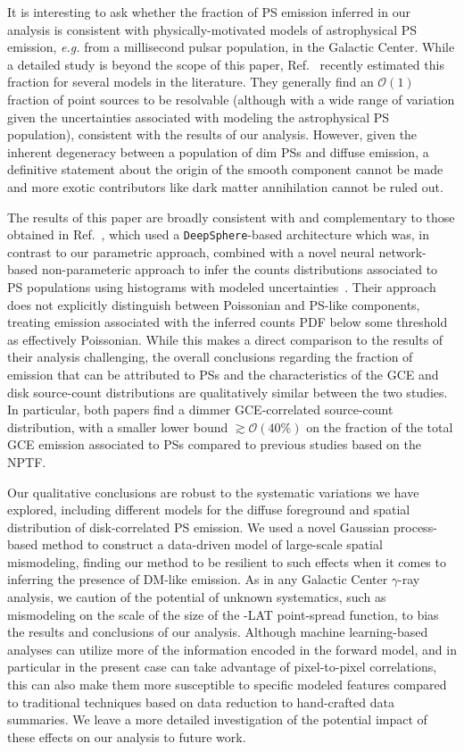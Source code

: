\documentclass[prd,aps,10pt,nofootinbib,twocolumn,superscriptaddress,preprintnumbers,balancelastpage,longbibliography,floatfix]{revtex4-2}
\begin{document}
It is interesting to ask whether the fraction of PS emission inferred in our analysis is consistent with physically-motivated models of astrophysical PS emission, \emph{e.g.} from a millisecond pulsar population, in the Galactic Center. While a detailed study is beyond the scope of this paper, Ref.~\cite{Dinsmore:2021nip} recently estimated this fraction for several models in the literature. They generally find an $\mathcal O(1)$ fraction of point sources to be resolvable (although with a wide range of variation given the uncertainties associated with modeling the astrophysical PS population), consistent with the results of our analysis. However, given the inherent degeneracy between a population of dim PSs and diffuse emission, a definitive statement about the origin of the smooth component cannot be made and more exotic contributors like dark matter annihilation cannot be ruled out.

The results of this paper are broadly consistent with and complementary to those obtained in Ref.~\cite{List:2021aer}, which used a \texttt{DeepSphere}-based architecture which was, in contrast to our parametric approach, combined with a novel neural network-based non-parameteric approach to infer the counts distributions associated to PS populations using histograms with modeled uncertainties~\cite{List2021}. Their approach does not explicitly distinguish between Poissonian and PS-like components, treating emission associated with the inferred counts PDF below some threshold as effectively Poissonian. While this makes a direct comparison to the results of their analysis challenging, the overall conclusions regarding the fraction of emission that can be attributed to PSs and the characteristics of the GCE and disk source-count distributions are qualitatively similar between the two studies. In particular, both papers find a dimmer GCE-correlated source-count distribution, with a smaller lower bound $\gtrsim \mathcal O(40\%)$ on the fraction of the total GCE emission associated to PSs compared to previous studies based on the NPTF.

Our qualitative conclusions are robust to the systematic variations we have explored, including different models for the diffuse foreground and spatial distribution of disk-correlated PS emission. We used a novel Gaussian process-based method to construct a data-driven model of large-scale spatial mismodeling, finding our method to be resilient to such effects when it comes to inferring the presence of DM-like emission. As in any Galactic Center $\gamma$-ray analysis, we caution of the potential of unknown systematics, such as mismodeling on the scale of the size of the \Fermi-LAT point-spread function, to bias the results and conclusions of our analysis. Although machine learning-based analyses can utilize more of the information encoded in the forward model, and in particular in the present case can take advantage of pixel-to-pixel correlations, this can also make them more susceptible to specific modeled features compared to traditional techniques based on data reduction to hand-crafted data summaries. We leave a more detailed investigation of the potential impact of these effects on our analysis to future work.
\end{document}
